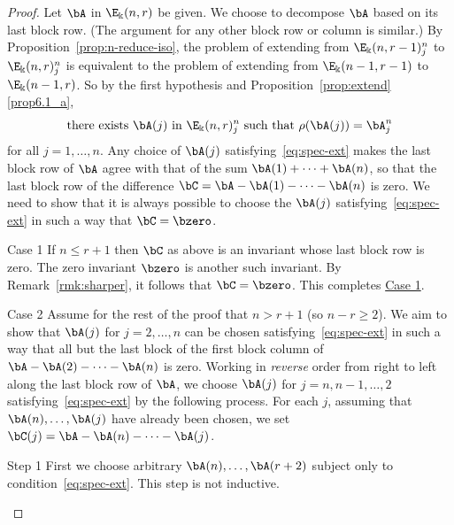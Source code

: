 \begin{proof}
Let $\bA$ in $\E_\Bbbk(n,r)$ be given. We choose to decompose $\bA$
based on its last block row. (The argument for any other block row or
column is similar.) By Proposition~\ref{prop:n-reduce-iso}, the
problem of extending from $\E_\Bbbk(n,r-1)^n_j$ to $\E_\Bbbk(n,r)^n_j$
is equivalent to the problem of extending from $\E_\Bbbk(n-1,r-1)$ to
$\E_\Bbbk(n-1,r)$. So by the first hypothesis and Proposition~\ref{prop:extend}\ref{prop6.1_a},
\begin{equation}\label{eq:spec-ext}
\text{there exists $\bA(j)$ in $\E_\Bbbk(n,r)^n_j$ such that
 $\rho(\bA(j)) = \bA^n_j$}
\end{equation}
for all $j = 1, \dots, n$. Any choice of $\bA(j)$ satisfying~\eqref{eq:spec-ext} makes the last block row of $\bA$ agree with that of the sum $\bA(1)+\cdots +\bA(n)$, so that the last block row of the
difference $\bC=\bA-\bA(1)-\cdots -\bA(n)$ is zero. We need to show
that it is always possible to choose the $\bA(j)$ satisfying~\eqref{eq:spec-ext} in such a way that $\bC=\bzero$.

\begin{enonce*}{\hypertarget{Case 1}{Case 1}} If $n \le r+1$ then $\bC$ as
above is an invariant whose last block row is zero. The zero invariant
$\bzero$ is another such invariant. By Remark~\ref{rmk:sharper}, it
follows that $\bC= \bzero$. This completes \hyperlink{Case 1}{Case 1}.
\end{enonce*}

\begin{enonce*}{\hypertarget{Case 2}{Case 2}} Assume for the rest of the proof that $n > r+1$ (so
$n-r \ge 2$). We aim to show that $\bA(j)$ for $j=2, \dots, n$ can be
chosen satisfying~\eqref{eq:spec-ext} in such a way that all but the
last block of the first block column of $\bA - \bA(2) - \cdots -
\bA(n)$ is zero. Working in \emph{reverse} order from right to left
along the last block row of $\bA$, we choose $\bA(j)$ for $j = n, n-1,
\dots, 2$ satisfying~\eqref{eq:spec-ext} by the following process. For
each $j$, assuming that $\bA(n), \dots, \bA(j)$ have already been
chosen, we set $\bC(j)=\bA-\bA(n)-\cdots -\bA(j)$.

\begin{enonce*}[remark]{\hypertarget{Step 1}{Step 1}} First we choose arbitrary $\bA(n), \dots, \bA(r+2)$
subject only to condition~\eqref{eq:spec-ext}. This step is not
inductive.
\end{enonce*}


\end{enonce*}
\end{proof}
